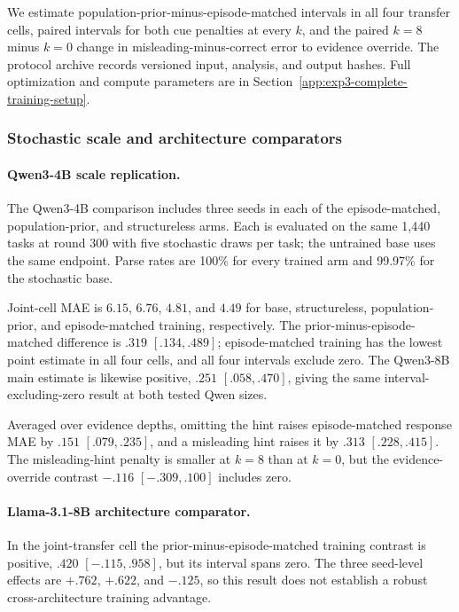 We estimate population-prior-minus-episode-matched intervals in all four transfer
cells, paired intervals for both cue penalties at every $k$, and the paired
$k=8$ minus $k=0$ change in misleading-minus-correct error to evidence override.
The protocol archive records versioned input, analysis, and output hashes. Full
optimization and compute parameters are in
Section~\ref{app:exp3-complete-training-setup}.

\subsubsection{Stochastic scale and architecture comparators}
\label{app:exp3-coin-qwen-results}

\paragraph{Qwen3-4B scale replication.}
\label{app:exp3-coin-qwen4b}
The Qwen3-4B comparison includes three seeds in each of the episode-matched,
population-prior, and structureless arms. Each is evaluated on the same 1,440
tasks at round 300 with five stochastic draws per task; the untrained base uses
the same endpoint. Parse rates are 100\% for every trained arm
and 99.97\% for the stochastic base.

Joint-cell MAE is $6.15$, $6.76$, $4.81$, and $4.49$ for base,
structureless, population-prior, and episode-matched training, respectively.
The prior-minus-episode-matched difference is $.319$ $[.134,.489]$;
episode-matched training has the lowest point estimate in all four cells, and
all four intervals exclude zero. The Qwen3-8B main estimate is likewise positive,
$.251$ $[.058,.470]$, giving the same interval-excluding-zero result at both
tested Qwen sizes.

Averaged over evidence depths, omitting the hint raises episode-matched response
MAE by $.151$ $[.079,.235]$, and a misleading hint raises it by $.313$
$[.228,.415]$. The misleading-hint penalty is smaller at $k=8$ than at $k=0$,
but the evidence-override contrast $-.116$ $[-.309,.100]$ includes zero.

\paragraph{Llama-3.1-8B architecture comparator.}
In the joint-transfer cell the prior-minus-episode-matched training contrast is
positive, $.420$ $[-.115,.958]$, but its interval spans zero. The three seed-level
effects are $+.762$, $+.622$, and $-.125$, so this result does not establish a
robust cross-architecture training advantage.

